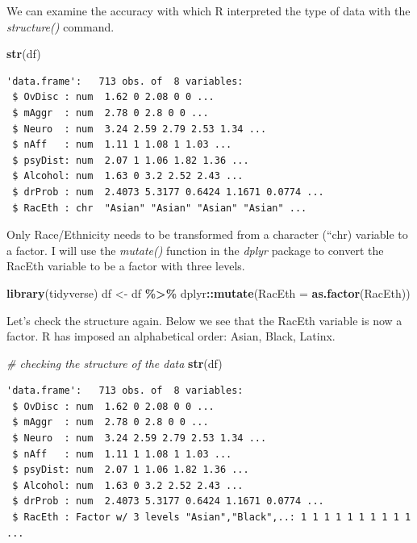 \documentclass[
  11pt,
]{book}
\newenvironment{Shaded}{\begin{snugshade}}{\end{snugshade}}
\newcommand{\AttributeTok}[1]{\textcolor[rgb]{0.27,0.27,0.27}{#1}}
\newcommand{\CommentTok}[1]{\textcolor[rgb]{0.37,0.37,0.37}{\textit{#1}}}
\newcommand{\FunctionTok}[1]{\textcolor[rgb]{0.27,0.27,0.27}{\textbf{#1}}}
\newcommand{\NormalTok}[1]{#1}
\newcommand{\OtherTok}[1]{\textcolor[rgb]{0.37,0.37,0.37}{#1}}
\newcommand{\SpecialCharTok}[1]{\textcolor[rgb]{0.43,0.43,0.43}{\textbf{#1}}}
\begin{document}
We can examine the accuracy with which R interpreted the type of data with the \emph{structure()} command.

\begin{Shaded}
\begin{Highlighting}[]
\FunctionTok{str}\NormalTok{(df)}
\end{Highlighting}
\end{Shaded}

\begin{verbatim}
'data.frame':   713 obs. of  8 variables:
 $ OvDisc : num  1.62 0 2.08 0 0 ...
 $ mAggr  : num  2.78 0 2.8 0 0 ...
 $ Neuro  : num  3.24 2.59 2.79 2.53 1.34 ...
 $ nAff   : num  1.11 1 1.08 1 1.03 ...
 $ psyDist: num  2.07 1 1.06 1.82 1.36 ...
 $ Alcohol: num  1.63 0 3.2 2.52 2.43 ...
 $ drProb : num  2.4073 5.3177 0.6424 1.1671 0.0774 ...
 $ RacEth : chr  "Asian" "Asian" "Asian" "Asian" ...
\end{verbatim}

Only Race/Ethnicity needs to be transformed from a character (``chr) variable to a factor. I will use the \emph{mutate()} function in the \emph{dplyr} package to convert the RacEth variable to be a factor with three levels.

\begin{Shaded}
\begin{Highlighting}[]
\FunctionTok{library}\NormalTok{(tidyverse)}
\NormalTok{df }\OtherTok{\textless{}{-}}\NormalTok{ df }\SpecialCharTok{\%\textgreater{}\%}
\NormalTok{    dplyr}\SpecialCharTok{::}\FunctionTok{mutate}\NormalTok{(}\AttributeTok{RacEth =} \FunctionTok{as.factor}\NormalTok{(RacEth))}
\end{Highlighting}
\end{Shaded}

Let's check the structure again. Below we see that the RacEth variable is now a factor. R has imposed an alphabetical order: Asian, Black, Latinx.

\begin{Shaded}
\begin{Highlighting}[]
\CommentTok{\# checking the structure of the data}
\FunctionTok{str}\NormalTok{(df)}
\end{Highlighting}
\end{Shaded}

\begin{verbatim}
'data.frame':   713 obs. of  8 variables:
 $ OvDisc : num  1.62 0 2.08 0 0 ...
 $ mAggr  : num  2.78 0 2.8 0 0 ...
 $ Neuro  : num  3.24 2.59 2.79 2.53 1.34 ...
 $ nAff   : num  1.11 1 1.08 1 1.03 ...
 $ psyDist: num  2.07 1 1.06 1.82 1.36 ...
 $ Alcohol: num  1.63 0 3.2 2.52 2.43 ...
 $ drProb : num  2.4073 5.3177 0.6424 1.1671 0.0774 ...
 $ RacEth : Factor w/ 3 levels "Asian","Black",..: 1 1 1 1 1 1 1 1 1 1 ...
\end{verbatim}
\end{document}
